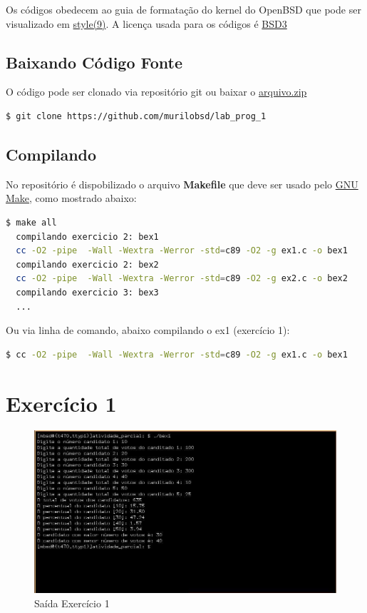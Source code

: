 \documentclass[12pt,a4paper]{article}
\let\oldsection\section
\renewcommand\section{\clearpage\oldsection}
\begin{document}
Os códigos obedecem ao guia de formatação do kernel do OpenBSD que pode ser 
visualizado em \href{https://man.openbsd.org/style}{style(9)}. A licença usada
para os códigos é \href{https://opensource.org/licenses/BSD-3-Clause}{BSD3}

\subsection{Baixando Código Fonte}
\noindent O código pode ser clonado via repositório git ou baixar o
\href{https://github.com/murilobsd/lab_prog_1/archive/0.0.1.zip}{arquivo.zip}

\begin{lstlisting}[language=bash]
  $ git clone https://github.com/murilobsd/lab_prog_1
\end{lstlisting}

\subsection{Compilando}
\noindent No repositório é dispobilizado o arquivo \textbf{Makefile} que deve
ser usado pelo \href{https://www.gnu.org/software/make/}{GNU Make}, como
mostrado abaixo:
\begin{lstlisting}[language=bash]
  $ make all
  compilando exercicio 2: bex1
  cc -O2 -pipe  -Wall -Wextra -Werror -std=c89 -O2 -g ex1.c -o bex1
  compilando exercicio 2: bex2
  cc -O2 -pipe  -Wall -Wextra -Werror -std=c89 -O2 -g ex2.c -o bex2
  compilando exercicio 3: bex3
  ...
\end{lstlisting}

\noindent Ou via linha de comando, abaixo compilando o ex1 (exercício 1):
\begin{lstlisting}[language=bash]
  $ cc -O2 -pipe  -Wall -Wextra -Werror -std=c89 -O2 -g ex1.c -o bex1
\end{lstlisting}

\pagebreak

\section{Exercício 1}

\begin{figure}[htb!]
	\centering
	\includegraphics[width=16cm]{ex1}
	\caption{Saída Exercício 1}
	\label{fig:1}
\end{figure}
\end{document}
